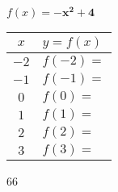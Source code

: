 \documentclass[12pt,letterpaper]{memoir}
\begin{document}
%
%
\myWideProblemWithContent
{
    \small
    \begin{center}
    $f(x) = \bm{-x^2 + 4}$
    \end{center}
    \begin{minipage}{0.6\textwidth}
        \renewcommand{\arraystretch}{1.75}
        \begin{tabular}{c|p{2.5in}}
                \hline
            $x$ & $y = f(x)$ \\
            \hline\hline 
            $-2$ & $f(-2) =$ \\\hline
            $-1$ & $f(-1) =$ \\\hline
            $0$  & $f(0) =$ \\\hline
            $1$  & $f(1) =$ \\\hline 
            $2$  & $f(2) =$ \\\hline
            $3$  & $f(3) =$ \\\hline
        \end{tabular}
    \end{minipage}
    \begin{minipage}{0.4\textwidth}
        \begin{myTikzpictureGrid}{0.35} {6}{6}
        \end{myTikzpictureGrid}
    \end{minipage}
}
\end{document}
